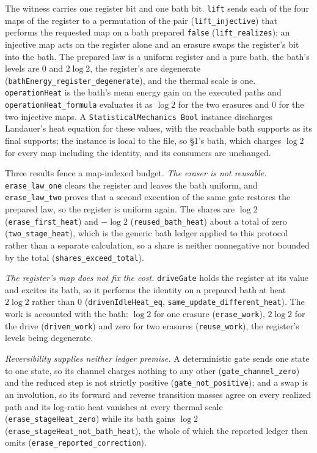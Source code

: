 \documentclass{article}
\begin{document}
The witness carries one register bit and one bath bit. \texttt{lift} sends each
of the four maps of the register to a permutation of the pair
(\nolinkurl{lift_injective}) that performs the requested map on a
bath prepared \texttt{false} (\nolinkurl{lift_realizes}); an
injective map acts on the register alone and an erasure swaps the register's
bit into the bath. The prepared law is a uniform register and a pure bath, the
bath's levels are $0$ and $2\log2$, the register's are degenerate
(\nolinkurl{bathEnergy_register_degenerate}), and the
thermal scale is one. \texttt{operationHeat} is the bath's mean energy gain on
the executed paths and \nolinkurl{operationHeat_formula} evaluates it
as $\log2$ for the two erasures and $0$ for the two injective maps. A
\texttt{StatisticalMechanics Bool} instance discharges Landauer's heat equation
for these values, with the reachable bath supports as its final supports; the
instance is local to the file, so \S1's bath, which charges $\log2$ for every
map including the identity, and its consumers are unchanged.

Three results fence a map-indexed budget. \emph{The eraser is not reusable.}
\nolinkurl{erase_law_one} clears the register and
leaves the bath uniform, and \nolinkurl{erase_law_two}
proves that a second execution of the same gate restores the prepared law, so
the register is uniform again. The shares are $\log2$
(\nolinkurl{erase_first_heat}) and $-\log2$
(\nolinkurl{reused_bath_heat}) about a total of zero
(\nolinkurl{two_stage_heat}), which is the generic bath
ledger applied to this protocol rather than a separate calculation, so a share
is neither nonnegative nor bounded by the total
(\nolinkurl{shares_exceed_total}).

\emph{The register's map does not fix the cost.}
\texttt{driveGate} holds the register at its value and excites its bath, so it
performs the identity on a prepared bath at heat $2\log2$ rather than $0$
(\nolinkurl{drivenIdleHeat_eq},
\nolinkurl{same_update_different_heat}).
The work is accounted with the bath: $\log2$ for one erasure
(\nolinkurl{erase_work}), $2\log2$ for the drive
(\nolinkurl{driven_work}) and zero for two erasures
(\nolinkurl{reuse_work}), the register's levels being degenerate.

\emph{Reversibility supplies neither ledger premise.} A deterministic gate
sends one state to one state, so its channel charges nothing to any other
(\nolinkurl{gate_channel_zero}) and the reduced step
is not strictly positive
(\nolinkurl{gate_not_positive}); and a swap is an
involution, so its forward and reverse transition masses agree on every
realized path and its log-ratio heat vanishes at every thermal scale
(\nolinkurl{erase_stageHeat_zero}) while its bath gains
$\log2$ (\nolinkurl{erase_stageHeat_not_bath_heat}), the whole of which the reported ledger then omits
(\nolinkurl{erase_reported_correction}).
\end{document}
